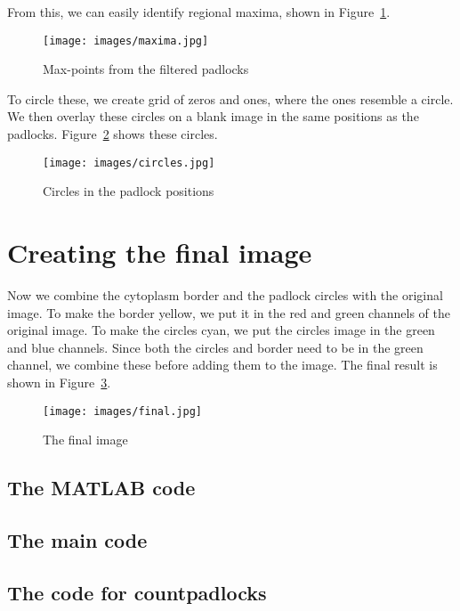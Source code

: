 \documentclass[twocolumn]{article}
\begin{document}
From this, we can easily identify regional maxima, shown in
Figure~\ref{fig:maxima}.

\begin{figure}[h!]
    \centering
    \texttt{[image: images/maxima.jpg]}
    \caption{Max-points from the filtered padlocks}
    \label{fig:maxima}
\end{figure}

To circle these, we create grid of zeros and ones, where the ones resemble a
circle. We then overlay these circles on a blank image in the same
positions as the padlocks. Figure~\ref{fig:circles} shows these circles.

\begin{figure}[h!]
    \centering
    \texttt{[image: images/circles.jpg]}
    \caption{Circles in the padlock positions}
    \label{fig:circles}
\end{figure}

\section{Creating the final image}

Now we combine the cytoplasm border and the padlock circles with the original
image. To make the border yellow, we put it in the red and green channels of
the original image. To make the circles cyan, we put the circles image in the
green and blue channels. Since both the circles and border need to be in the
green channel, we combine these before adding them to the image. The final
result is shown in Figure~\ref{fig:final}.

\onecolumn
\begin{figure}[h!]
    \centering
    \texttt{[image: images/final.jpg]}
    \caption{The final image}
    \label{fig:final}
\end{figure}

\newpage
\onecolumn
\begin{appendices}

\section{The MATLAB code}

\subsection{The main code}



\subsection{The code for countpadlocks}



\end{appendices}
\end{document}
